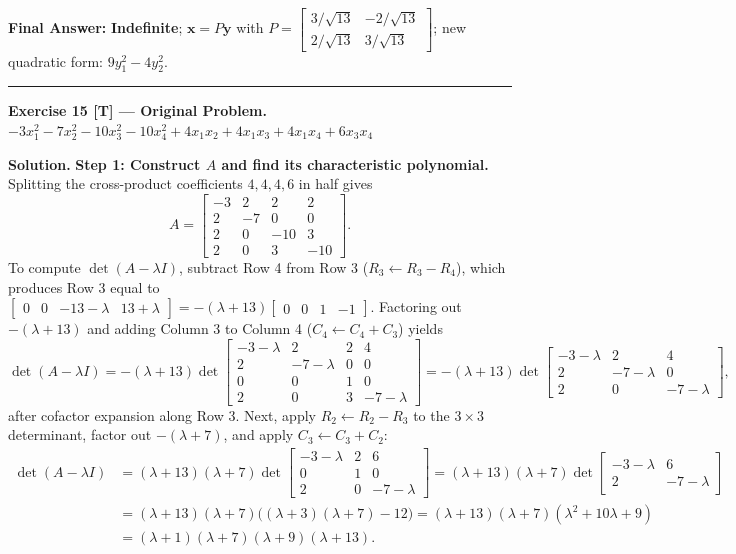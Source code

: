\documentclass[11pt, letterpaper]{article}
\theoremstyle{definition}
\theoremstyle{remark}
\begin{document}
\textbf{Final Answer:} \textbf{Indefinite}; $\mathbf{x} = P\mathbf{y}$ with $P = \begin{bmatrix} 3/\sqrt{13} & -2/\sqrt{13} \\ 2/\sqrt{13} & 3/\sqrt{13} \end{bmatrix}$; new quadratic form: $9y_1^2 - 4y_2^2$.

\medskip
\hrule
\medskip

\textbf{Exercise 15 [T] --- Original Problem.} $-3x_1^2 - 7x_2^2 - 10x_3^2 - 10x_4^2 + 4x_1x_2 + 4x_1x_3 + 4x_1x_4 + 6x_3x_4$

\textbf{Solution.}
\textbf{Step 1: Construct $A$ and find its characteristic polynomial.}
Splitting the cross-product coefficients $4, 4, 4, 6$ in half gives
\[
A = \begin{bmatrix} -3 & 2 & 2 & 2 \\ 2 & -7 & 0 & 0 \\ 2 & 0 & -10 & 3 \\ 2 & 0 & 3 & -10 \end{bmatrix}.
\]
To compute $\det(A - \lambda I)$, subtract Row 4 from Row 3 ($R_3 \leftarrow R_3 - R_4$), which produces Row 3 equal to $\begin{bmatrix} 0 & 0 & -13 - \lambda & 13 + \lambda \end{bmatrix} = -(\lambda + 13)\begin{bmatrix} 0 & 0 & 1 & -1 \end{bmatrix}$. Factoring out $-(\lambda + 13)$ and adding Column 3 to Column 4 ($C_4 \leftarrow C_4 + C_3$) yields
\[
\det(A - \lambda I) = -(\lambda + 13) \det \begin{bmatrix} -3 - \lambda & 2 & 2 & 4 \\ 2 & -7 - \lambda & 0 & 0 \\ 0 & 0 & 1 & 0 \\ 2 & 0 & 3 & -7 - \lambda \end{bmatrix} = -(\lambda + 13) \det \begin{bmatrix} -3 - \lambda & 2 & 4 \\ 2 & -7 - \lambda & 0 \\ 2 & 0 & -7 - \lambda \end{bmatrix},
\]
after cofactor expansion along Row 3. Next, apply $R_2 \leftarrow R_2 - R_3$ to the $3 \times 3$ determinant, factor out $-(\lambda + 7)$, and apply $C_3 \leftarrow C_3 + C_2$:
\begin{align*}
\det(A - \lambda I) &= (\lambda + 13)(\lambda + 7) \det \begin{bmatrix} -3 - \lambda & 2 & 6 \\ 0 & 1 & 0 \\ 2 & 0 & -7 - \lambda \end{bmatrix} = (\lambda + 13)(\lambda + 7) \det \begin{bmatrix} -3 - \lambda & 6 \\ 2 & -7 - \lambda \end{bmatrix} \\
&= (\lambda + 13)(\lambda + 7)\big((\lambda + 3)(\lambda + 7) - 12\big) = (\lambda + 13)(\lambda + 7)(\lambda^2 + 10\lambda + 9) \\
&= (\lambda + 1)(\lambda + 7)(\lambda + 9)(\lambda + 13).
\end{align*}
\end{document}
